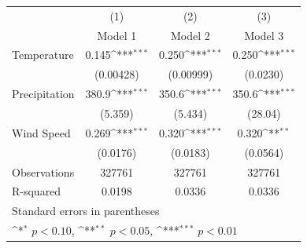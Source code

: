 {
\def\sym#1{\ifmmode^{#1}\else\(^{#1}\)\fi}
\begin{tabular}{l*{3}{c}}
\hline\hline
                    &\multicolumn{1}{c}{(1)}&\multicolumn{1}{c}{(2)}&\multicolumn{1}{c}{(3)}\\
                    &\multicolumn{1}{c}{Model 1}&\multicolumn{1}{c}{Model 2}&\multicolumn{1}{c}{Model 3}\\
\hline
Temperature         &       0.145\sym{***}&       0.250\sym{***}&       0.250\sym{***}\\
                    &   (0.00428)         &   (0.00999)         &    (0.0230)         \\
Precipitation       &       380.9\sym{***}&       350.6\sym{***}&       350.6\sym{***}\\
                    &     (5.359)         &     (5.434)         &     (28.04)         \\
Wind Speed          &       0.269\sym{***}&       0.320\sym{***}&       0.320\sym{**} \\
                    &    (0.0176)         &    (0.0183)         &    (0.0564)         \\
\hline
Observations        &      327761         &      327761         &      327761         \\
R-squared           &      0.0198         &      0.0336         &      0.0336         \\
\hline\hline
\multicolumn{4}{l}{\footnotesize Standard errors in parentheses}\\
\multicolumn{4}{l}{\footnotesize \sym{*} \(p<0.10\), \sym{**} \(p<0.05\), \sym{***} \(p<0.01\)}\\
\end{tabular}
}
